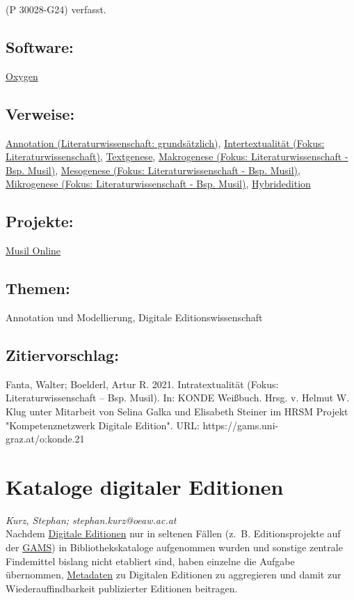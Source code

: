 \documentclass{article}
\begin{document}
                  (P 30028-G24) verfasst.\subsection*{Software:}\href{http://oxygenxml.com/}{Oxygen}\subsection*{Verweise:}\href{https://gams.uni-graz.at/o:konde.17}{Annotation (Literaturwissenschaft:
                           grundsätzlich)}, \href{https://gams.uni-graz.at/o:konde.20}{Intertextualität (Fokus:
                           Literaturwissenschaft)}, \href{https://gams.uni-graz.at/o:konde.28}{Textgenese}, \href{https://gams.uni-graz.at/o:konde.23}{Makrogenese (Fokus:
                           Literaturwissenschaft - Bsp. Musil)}, \href{https://gams.uni-graz.at/o:konde.24}{Mesogenese (Fokus:
                           Literaturwissenschaft - Bsp. Musil)}, \href{https://gams.uni-graz.at/o:konde.26}{Mikrogenese (Fokus:
                           Literaturwissenschaft - Bsp. Musil)}, \href{https://gams.uni-graz.at/o:konde.96}{Hybridedition}\subsection*{Projekte:}\href{http://musilonline.at}{Musil Online}\subsection*{Themen:}Annotation und Modellierung, Digitale Editionswissenschaft\subsection*{Zitiervorschlag:}Fanta, Walter; Boelderl, Artur R. 2021. Intratextualität (Fokus: Literaturwissenschaft – Bsp. Musil). In: KONDE Weißbuch. Hrsg. v. Helmut W. Klug unter Mitarbeit von Selina Galka und Elisabeth Steiner im HRSM Projekt "Kompetenznetzwerk Digitale Edition". URL: https://gams.uni-graz.at/o:konde.21\newpage\section*{Kataloge digitaler Editionen} \emph{Kurz, Stephan; stephan.kurz@oeaw.ac.at }\\
        
    Nachdem \href{http://gams.uni-graz.at/o:konde.59}{Digitale Editionen} nur in
                     seltenen Fällen (z. B. Editionsprojekte auf der \href{http://gams.uni-graz.at/o:konde.70}{GAMS}) in Bibliothekskataloge aufgenommen wurden und
                     sonstige zentrale Findemittel bislang nicht etabliert sind, haben einzelne die
                     Aufgabe übernommen, \href{http://gams.uni-graz.at/o:konde.25}{Metadaten} zu
                     Digitalen Editionen zu aggregieren und damit zur Wiederauffindbarkeit publizierter
                     Editionen beitragen.\\
            
\end{document}
